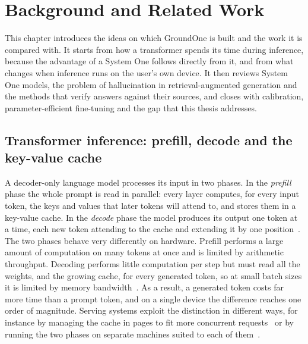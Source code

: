 \chapter{Background and Related Work}
\label{sec:background}


This chapter introduces the ideas on which GroundOne is built and the work it is compared with. It starts from how a
transformer spends its time during inference, because the advantage of a System One follows directly from it, and from
what changes when inference runs on the user's own device. It then reviews System One models, the problem of
hallucination in retrieval-augmented generation and the methods that verify answers against their sources, and closes
with calibration, parameter-efficient fine-tuning and the gap that this thesis addresses.

\section{Transformer inference: prefill, decode and the key-value cache}
\label{sec:bg-inference}

A decoder-only language model processes its input in two phases. In the \emph{prefill} phase the whole prompt is read in
parallel: every layer computes, for every input token, the keys and values that later tokens will attend to, and stores
them in a key-value cache. In the \emph{decode} phase the model produces its output one token at a time, each new token
attending to the cache and extending it by one position~\cite{pope2023scaling}. The two phases behave very differently on
hardware. Prefill performs a large amount of computation on many tokens at once and is limited by arithmetic throughput.
Decoding performs little computation per step but must read all the weights, and the growing cache, for every generated
token, so at small batch sizes it is limited by memory bandwidth~\cite{pope2023scaling,patel2024splitwise}. As a result,
a generated token costs far more time than a prompt token, and on a single device the difference reaches one order of
magnitude. Serving systems exploit the distinction in different ways, for instance by managing the cache in pages to fit
more concurrent requests~\cite{kwon2023pagedattention} or by running the two phases on separate machines suited to each
of them~\cite{patel2024splitwise}.

